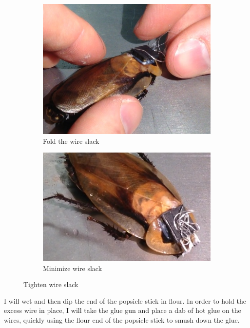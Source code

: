 \begin{figure}[ht!]
\centering
    \begin{subfigure}{.49\textwidth}
    \centering
    \includegraphics[scale=0.25]{Surgery Photos/nowire.JPG}
    \caption{Fold the wire slack}
    \label{fig:nowire}
    \end{subfigure}
    \begin{subfigure}{.49\textwidth}
    \centering
    \includegraphics[scale=0.4]{Surgery Photos/nowire2.JPG}
    \caption{Minimize wire slack}
    \label{fig:nowire2}
    \end{subfigure}
\caption{Tighten wire slack}
\label{fig:connectorB}
\end{figure}
I will wet and then dip the end of the popsicle stick in flour. In order to hold the excess wire in place, I will take the glue gun and place a dab of hot glue on the wires, quickly using the flour end of the popsicle stick to smush down the glue. 
